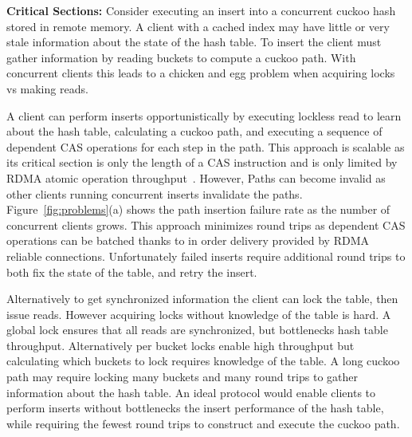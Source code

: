 \textbf{Critical Sections:} Consider executing an insert
into a concurrent cuckoo hash stored in remote memory. A
client with a cached index may have little or very stale
information about the state of the hash table. To insert the
client must gather information by reading buckets to compute
a cuckoo path. With concurrent clients this leads to a
chicken and egg problem when acquiring locks vs making
reads.

A client can perform inserts opportunistically by executing
lockless read to learn about the hash table, calculating a
cuckoo path, and executing a sequence of dependent CAS
operations for each step in the path. This approach is
scalable as its critical section is only the length of a CAS
instruction and is only limited by RDMA atomic operation
throughput~\cite{design-guidelines}. However, Paths can
become invalid as other clients running concurrent inserts
invalidate the paths. Figure~\ref{fig:problems}(a) shows the
path insertion failure rate as the number of concurrent
clients grows. This approach minimizes round trips as
dependent CAS operations can be batched thanks to in order
delivery provided by RDMA reliable connections.
Unfortunately failed inserts require additional round trips
to both fix the state of the table, and retry the
insert.

Alternatively to get synchronized information the client can
lock the table, then issue reads. However acquiring locks
without knowledge of the table is hard. A global lock
ensures that all reads are synchronized, but bottlenecks
hash table throughput. Alternatively per bucket locks
enable high throughput but calculating which buckets to lock
requires knowledge of the table. A long cuckoo path may
require locking many buckets and many round trips to gather
information about the hash table.
An ideal protocol would enable clients to perform inserts
without bottlenecks the insert performance of the hash
table, while requiring the fewest round trips to construct
and execute the cuckoo path.


